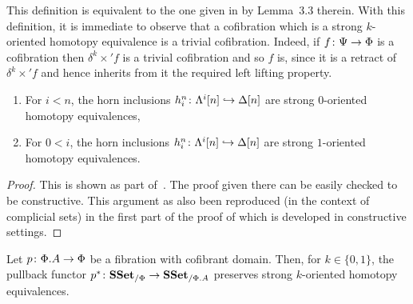 \documentclass[reqno,10pt,a4paper,oneside,draft]{amsart}
\begin{document}
This definition is equivalent to the one given in \cite{gambino2017frobenius} by Lemma~3.3 therein.
With this definition, it is immediate to observe that a cofibration which is a strong $k$-oriented homotopy equivalence is a trivial cofibration. Indeed, if $f \colon \Psi \to \Phi$ is a cofibration then $\delta^k \times ' f$ is a trivial
cofibration and so $f$ is, since it is a retract of $\delta^k \times ' f$ and hence inherits from it the
required left lifting property.

\begin{lemma}\label{lemma:genTcof_strongHequiv} \hfill 
\begin{enumerate}[$(i)$]
\item For $i < n$, the horn inclusions $h^n_i \colon \Lambda^i[n] \hookrightarrow \Delta[n]$ are strong $0$-oriented homotopy equivalences,
\item For $0 < i $, the horn inclusions $h^n_i \colon \Lambda^i[n] \hookrightarrow \Delta[n]$ are strong $1$-oriented homotopy equivalences.
\end{enumerate}
\end{lemma}

\begin{proof}
This is shown as part of~\cite[Theorem 3.2.3]{joyal-tierney:simplicial-homotopy-theory}. The proof given there can be easily checked to be constructive. This argument as also been reproduced (in the context of complicial sets) in the first part of the proof of \cite[Proposition~5.2.6]{henry2018wms} which is developed in constructive settings.
\end{proof}




\begin{lemma} 
\label{lemma:pb_of_StrongHomotopyEq}
Let $p \colon \Phi.A \rightarrow \Phi$ be a fibration with cofibrant domain. Then, for $k \in \{0,1\}$, 
the pullback functor $p^* \colon \mathbf{SSet}_{/\Phi} \to \mathbf{SSet}_{/\Phi.A}$ preserves strong $k$-oriented homotopy equivalences.
\end{lemma}
\end{document}
